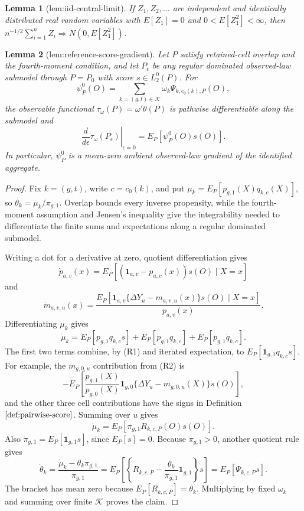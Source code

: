 \documentclass{article}
\newtheorem{lemma}{Lemma}
\begin{document}
\begin{lemma}[lem:iid-central-limit]\label{lem:iid-central-limit}
If \(Z_1,Z_2,\ldots\) are independent and identically distributed real random variables with \(E[Z_1]=0\) and \(0<E[Z_1^2]<\infty\), then \(n^{-1/2}\sum_{i=1}^n Z_i\Rightarrow N(0,E[Z_1^2])\).
\end{lemma}

\begin{lemma}[lem:reference-score-gradient]\label{lem:reference-score-gradient}
Let \(P\) satisfy retained-cell overlap and the fourth-moment condition, and let \(P_\epsilon\) be any regular dominated observed-law submodel through \(P=P_0\) with score \(s\in L_2^0(P)\).  For
\[
\psi_P^0(O)=\sum_{k=(g,t)\in\mathcal K}\omega_k\Psi_{k,c_0(k),P}(O),
\]
the observable functional \(\tau_\omega(P)=\omega'\theta(P)\) is pathwise differentiable along the submodel and
\[
\left.\frac{d}{d\epsilon}\tau_\omega(P_\epsilon)\right|_{\epsilon=0}
=E_P[\psi_P^0(O)s(O)].
\]
In particular, \(\psi_P^0\) is a mean-zero ambient observed-law gradient of the identified aggregate.
\end{lemma}
\begin{proof}
Fix \(k=(g,t)\), write \(c=c_0(k)\), and put \(\mu_k=E_P[p_{g,1}(X)q_{k,c}(X)]\), so \(\theta_k=\mu_k/\pi_{g,1}\).  Overlap bounds every inverse propensity, while the fourth-moment assumption and Jensen's inequality give the integrability needed to differentiate the finite sums and expectations along a regular dominated submodel.

Writing a dot for a derivative at zero, quotient differentiation gives
\[
\dot p_{a,v}(x)=E_P[(\mathbf 1_{a,v}-p_{a,v}(x))s(O)\mid X=x]
\tag{R1}
\]
and
\[
\dot m_{a,v,u}(x)
=\frac{E_P[\mathbf 1_{a,v}\{\Delta Y_u-m_{a,v,u}(x)\}s(O)\mid X=x]}{p_{a,v}(x)}.
\tag{R2}
\]
Differentiating \(\mu_k\) gives
\[
\dot\mu_k=E_P[p_{g,1}q_{k,c}s]+E_P[\dot p_{g,1}q_{k,c}]+E_P[p_{g,1}\dot q_{k,c}].
\tag{R3}
\]
The first two terms combine, by (R1) and iterated expectation, to \(E_P[\mathbf 1_{g,1}q_{k,c}s]\).  For example, the \(m_{g,0,u}\) contribution from (R2) is
\[
-E_P\!\left[\frac{p_{g,1}(X)}{p_{g,0}(X)}\mathbf 1_{g,0}
\{\Delta Y_u-m_{g,0,u}(X)\}s(O)\right],
\]
and the other three cell contributions have the signs in Definition \(\ref{def:pairwise-score}\).  Summing over \(u\) gives
\[
\dot\mu_k=E_P[\pi_{g,1}R_{k,c,P}(O)s(O)].
\tag{R4}
\]
Also \(\dot\pi_{g,1}=E_P[\mathbf 1_{g,1}s]\), since \(E_P[s]=0\).  Because \(\pi_{g,1}>0\), another quotient rule gives
\[
\dot\theta_k
=\frac{\dot\mu_k-\theta_k\dot\pi_{g,1}}{\pi_{g,1}}
=E_P\!\left[\left\{R_{k,c,P}-\frac{\theta_k}{\pi_{g,1}}\mathbf 1_{g,1}\right\}s\right]
=E_P[\Psi_{k,c,P}s].
\tag{R5}
\]
The bracket has mean zero because \(E_P[R_{k,c,P}]=\theta_k\).  Multiplying by fixed \(\omega_k\) and summing over finite \(\mathcal K\) proves the claim.
\end{proof}
\end{document}
